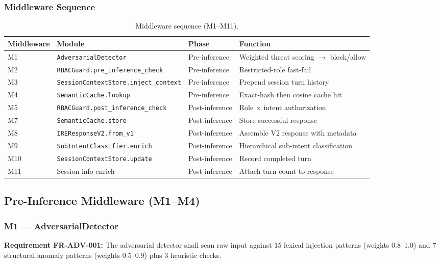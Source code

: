 ﻿\documentclass[10pt,journal,onecolumn]{IEEEtran}
\newcommand{\reqid}[1]{\textbf{#1}}
\begin{document}
\subsubsection{Middleware Sequence}
\begin{table}[t]
\caption{Middleware sequence (M1--M11).}
\label{tab:middleware}
\begin{tabularx}{\textwidth}{l l l X}
\toprule
\textbf{Middleware} & \textbf{Module} & \textbf{Phase} & \textbf{Function}\\
\midrule
M1 & \texttt{AdversarialDetector} & Pre-inference & Weighted threat scoring $\rightarrow$ block/allow\\
M2 & \texttt{RBACGuard.pre\_inference\_check} & Pre-inference & Restricted-role fast-fail\\
M3 & \texttt{SessionContextStore.inject\_context} & Pre-inference & Prepend session turn history\\
M4 & \texttt{SemanticCache.lookup} & Pre-inference & Exact-hash then cosine cache hit\\
M5 & \texttt{RBACGuard.post\_inference\_check} & Post-inference & Role $\times$ intent authorization\\
M7 & \texttt{SemanticCache.store} & Post-inference & Store successful response\\
M8 & \texttt{IREResponseV2.from\_v1} & Post-inference & Assemble V2 response with metadata\\
M9 & \texttt{SubIntentClassifier.enrich} & Post-inference & Hierarchical sub-intent classification\\
M10 & \texttt{SessionContextStore.update} & Post-inference & Record completed turn\\
M11 & Session info enrich & Post-inference & Attach turn count to response\\
\bottomrule
\end{tabularx}
\end{table}

\subsection{Pre-Inference Middleware (M1--M4)}

\subsubsection{M1 --- AdversarialDetector}
\reqid{Requirement FR-ADV-001:} The adversarial detector shall scan raw input against 15 lexical injection patterns (weights 0.8--1.0) and 7 structural anomaly patterns (weights 0.5--0.9) plus 3 heuristic checks.
\end{document}

